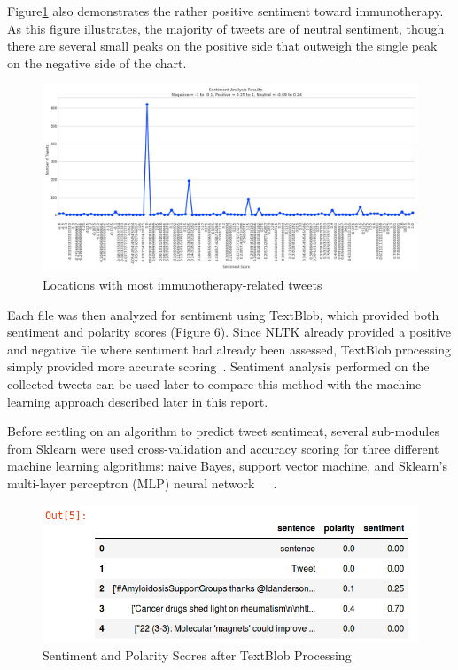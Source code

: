 Figure\ref{fig:sentline} also demonstrates the rather positive
sentiment toward immunotherapy.  As this figure illustrates, the
majority of tweets are of neutral sentiment, though there are several
small peaks on the positive side that outweigh the single peak on the
negative side of the chart.

\begin{figure}[H]
\centering
\includegraphics[width=\columnwidth]{images/sentiment_scores_linechart.png}
\caption{Locations with most immunotherapy-related tweets}
\label{fig:sentline}
\end{figure} 

Each file was then analyzed for sentiment using TextBlob, which
provided both sentiment and polarity scores (Figure 6).  Since NLTK
already provided a positive and negative file where sentiment had
already been assessed, TextBlob processing simply provided more
accurate scoring~\cite{jain2018}.  Sentiment analysis performed on the
collected tweets can be used later to compare this method with the
machine learning approach described later in this report.

Before settling on an algorithm to predict tweet sentiment, several
sub-modules from Sklearn were used cross-validation and accuracy
scoring for three different machine learning algorithms: naive Bayes,
support vector machine, and Sklearn's multi-layer perceptron (MLP)
neural
network~\cite{brownlee_2016}~\cite{ads_algorithms}~\cite{raschka2016}.

\begin{figure}[H]
\centering
\includegraphics[width=\columnwidth]{images/collected_tweets_head.png}
\caption{Sentiment and Polarity Scores after TextBlob Processing}
\label{fig:scores_textblob}
\end{figure} 

